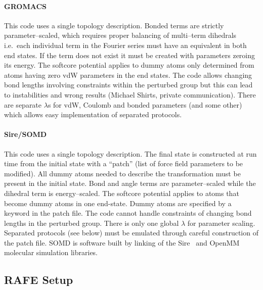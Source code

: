 \documentclass[journal=jctcce,manuscript=article]{achemso}
\begin{document}
\paragraph{GROMACS} This code uses a single topology description.
Bonded terms are strictly parameter--scaled, which requires proper
balancing of multi--term dihedrals i.e.\ each individual term in the Fourier 
series must have an equivalent in both end states.  If the term does not exist 
it must be created with parameters zeroing its energy.
The softcore potential applies to dummy 
atoms only determined from atoms having zero vdW parameters in the end states.
The code
allows changing bond lengths involving constraints within the perturbed group 
but this can lead to instabilities and wrong results (Michael Shirts,
private communication).  There are separate $\lambda$s for vdW,
Coulomb and bonded parameters (and some other) which allows easy implementation 
of separated protocols.

\paragraph{Sire/SOMD} This code uses a single topology description.
The final state is constructed at run time from the initial state with
a ``patch'' (list of force field parameters to be modified). All dummy atoms
needed to describe the transformation must be present in the initial state. Bond and
angle terms are parameter--scaled while the dihedral term is
energy--scaled.  The softcore potential applies to atoms that become dummy atoms
 in one end-state. Dummy atoms are specified by a keyword in the patch file.
The code cannot handle constraints of changing bond lengths in the
perturbed group.  There is only one global $\lambda$ for parameter
scaling.  Separated protocols (see below) must be emulated through
careful construction of the patch file.  SOMD is software built by linking of
the Sire~\cite{Sire-2016} and OpenMM~\cite{doi:10.1021/ct300857j} molecular
simulation libraries.


\subsection{RAFE Setup}
\label{sec:rafe_setup}
\end{document}
